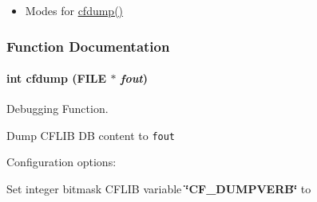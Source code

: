 \begin{itemize}
\item Modes for \hyperlink{group__advanced__features_gecfc8ee37366e1b36cb5aac0cc41ebdc}{cfdump()} \end{itemize}


\subsubsection{Function Documentation}
\hypertarget{group__advanced__features_gecfc8ee37366e1b36cb5aac0cc41ebdc}{
\paragraph[{cfdump}]{\setlength{\rightskip}{0pt plus 5cm}int cfdump (FILE $\ast$ {\em fout})}\hfill}
\label{group__advanced__features_gecfc8ee37366e1b36cb5aac0cc41ebdc}


Debugging Function. 

Dump CFLIB DB content to {\tt fout} 

Configuration options:

Set integer bitmask CFLIB variable {\bf \char`\"{}CF\_\-DUMPVERB\char`\"{}} to

